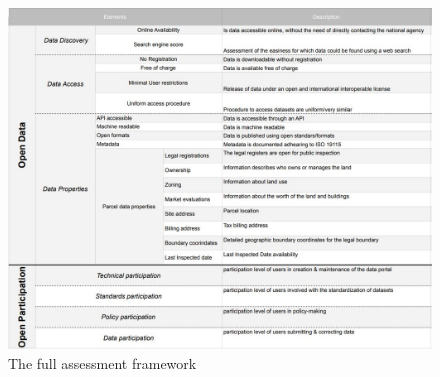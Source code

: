 \begin{figure}
    \hspace*{-3cm}
    \graphicspath{ {images/} }
    \includegraphics[width=20cm]{images/assessment_framework_description.JPG}
    \caption{The full assessment framework}
    \label{fig:assesment_result}
\end{figure}